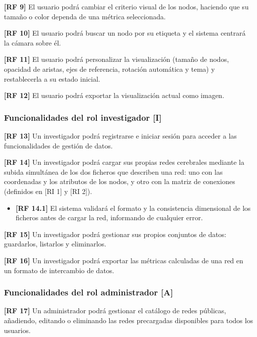 \noindent\textbf{[RF 9]} El usuario podrá cambiar el criterio visual de los nodos, haciendo que su
tamaño o color dependa de una métrica seleccionada.

\noindent\textbf{[RF 10]} El usuario podrá buscar un nodo por su etiqueta y el sistema centrará la
cámara sobre él.

\noindent\textbf{[RF 11]} El usuario podrá personalizar la visualización (tamaño de nodos, opacidad
de aristas, ejes de referencia, rotación automática y tema) y restablecerla a su estado inicial.

\noindent\textbf{[RF 12]} El usuario podrá exportar la visualización actual como imagen.

\subsubsection*{Funcionalidades del rol investigador [I]}

\noindent\textbf{[RF 13]} Un investigador podrá registrarse e iniciar sesión para acceder a las
funcionalidades de gestión de datos.

\noindent\textbf{[RF 14]} Un investigador podrá cargar sus propias redes cerebrales mediante la
subida simultánea de los dos ficheros que describen una red: uno con las coordenadas y los atributos
de los nodos, y otro con la matriz de conexiones (definidos en [RI 1] y [RI 2]).
\begin{itemize}
	\item \textbf{[RF 14.1]} El sistema validará el formato y la consistencia dimensional de los
		ficheros antes de cargar la red, informando de cualquier error.
\end{itemize}

\noindent\textbf{[RF 15]} Un investigador podrá gestionar sus propios conjuntos de datos: guardarlos,
listarlos y eliminarlos.

\noindent\textbf{[RF 16]} Un investigador podrá exportar las métricas calculadas de una red en un
formato de intercambio de datos.

\subsubsection*{Funcionalidades del rol administrador [A]}

\noindent\textbf{[RF 17]} Un administrador podrá gestionar el catálogo de redes públicas, añadiendo,
editando o eliminando las redes precargadas disponibles para todos los usuarios.

